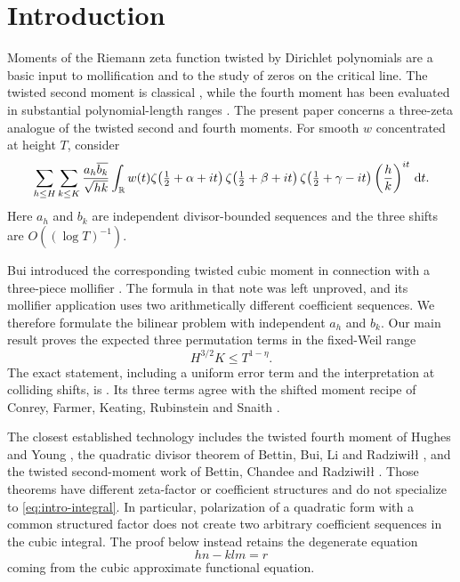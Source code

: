 \section{Introduction}

Moments of the Riemann zeta function twisted by Dirichlet polynomials are a
basic input to mollification and to the study of zeros on the critical line.
The twisted second moment is classical \cite{BCHB1985}, while the fourth
moment has been evaluated in substantial polynomial-length ranges
\cite{HughesYoung2010,BBLR2020}.
The present paper concerns a three-zeta analogue of the twisted second and
fourth moments.  For smooth $w$ concentrated at height $T$, consider
\begin{equation}\label{eq:intro-integral}
 \sum_{h\leq H}\sum_{k\leq K}\frac{a_h\overline{b_k}}{\sqrt{hk}}
 \int_{\mathbb R}w(t)
 \zeta\!\left(\tfrac12+\alpha+it\right)
 \zeta\!\left(\tfrac12+\beta+it\right)
 \zeta\!\left(\tfrac12+\gamma-it\right)
 \left(\frac hk\right)^{it}\,\mathrm d t.
\end{equation}
Here $a_h$ and $b_k$ are independent divisor-bounded sequences and the three
shifts are $O((\log T)^{-1})$.

Bui introduced the corresponding twisted cubic moment in connection with a
three-piece mollifier \cite{Bui2014}.  The formula in that note was left
unproved, and its mollifier application uses two arithmetically different
coefficient sequences.  We therefore formulate the bilinear problem with
independent $a_h$ and $b_k$.  Our main result proves the expected three
permutation terms in the fixed-Weil range
\begin{equation}\label{eq:intro-range}
                    H^{3/2}K\leq T^{1-\eta}.
\end{equation}
The exact statement, including a uniform error term and the interpretation at
colliding shifts, is .  Its three terms agree with the shifted
moment recipe of Conrey, Farmer, Keating, Rubinstein and Snaith
\cite{CFKRS2005}.

The closest established technology includes the twisted fourth moment of
Hughes and Young \cite{HughesYoung2010}, the quadratic divisor theorem of
Bettin, Bui, Li and Radziwi{\l}{\l} \cite{BBLR2020}, and the twisted second-moment
work of Bettin, Chandee and Radziwi{\l}{\l} \cite{BCR2017}.  Those theorems have
different zeta-factor or coefficient structures and do not specialize to
\eqref{eq:intro-integral}.  In particular, polarization of a quadratic form
with a common structured factor does not create two arbitrary coefficient
sequences in the cubic integral.  The proof below instead retains the
degenerate equation
\[
                         hn-klm=r
\]
coming from the cubic approximate functional equation.

